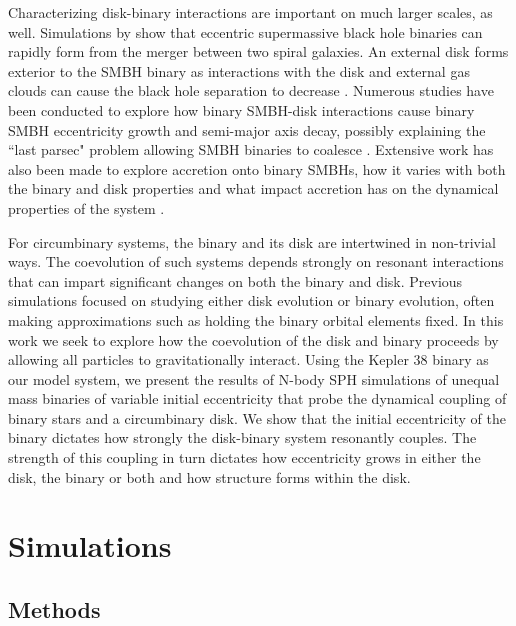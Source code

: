 Characterizing disk-binary interactions are important on much larger scales, as well.  Simulations by \citet{Mayer2007} show that eccentric supermassive
black hole binaries can rapidly form from the merger between two spiral galaxies.  An external disk forms exterior to the SMBH binary
as interactions with the disk and external gas clouds can cause the black hole separation to decrease \citep{Roskar2015}.  Numerous studies have been 
conducted to explore how binary SMBH-disk interactions cause binary SMBH eccentricity growth and semi-major axis decay, possibly 
explaining the ``last parsec" problem allowing SMBH binaries to coalesce \citep[e.g.][]{Armitage2005,Escala2005,Cuadra2009,Roedig2012,Aly2015}.  Extensive work
has also been made to explore accretion onto binary SMBHs, how it varies with both the binary and disk properties and what impact accretion
has on the dynamical properties of the system \citep[e.g.][]{Shi2012,DOrazio2013,Nixon2013,Farris2014}.
 
For circumbinary systems, the binary and its disk are intertwined in
non-trivial ways.  The coevolution of such systems depends strongly on
resonant interactions that can impart significant changes on both the
binary and disk.  Previous simulations focused on studying either disk evolution or binary evolution, often making approximations
such as holding the binary orbital elements fixed.  In this work we seek to explore how the coevolution
of the disk and binary proceeds by allowing all particles to gravitationally interact.  
Using the Kepler 38 binary as our model system, we present the results of N-body
SPH simulations of unequal mass binaries of variable initial eccentricity 
that probe the dynamical coupling of binary stars and a circumbinary disk.  
We show that the initial eccentricity of the binary dictates how strongly the disk-binary system resonantly couples.
The strength of this coupling in turn dictates how eccentricity grows in either the disk, the binary or both and how structure 
forms within the disk.

\section{Simulations}

\subsection{Methods} \label{CBDisk:sec:methods_section}

